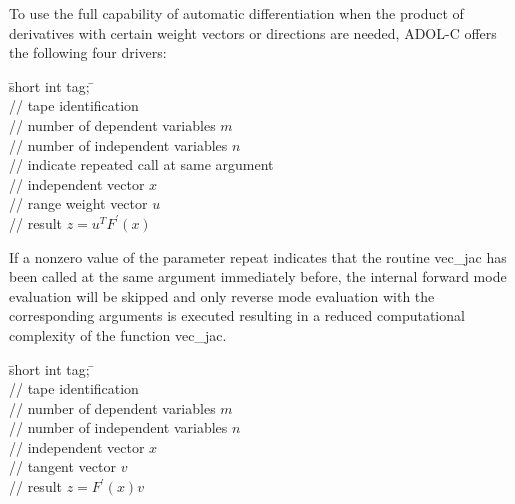 \documentclass[11pt,twoside]{article}
\begin{document}
To use the full capability of automatic differentiation when the 
product of derivatives with certain weight vectors or directions are needed, ADOL-C offers
the following four drivers:  
%
\begin{tabbing}
\hspace{0.5in}\={\sf short int tag;} \hspace{1.1in}\= \kill    %
\\
         \> // tape identification \\
                 \> // number of dependent variables $m$\\ 
                 \> // number of independent variables $n$\\
            \> // indicate repeated call at same argument\\
           \> // independent vector $x$ \\
           \> // range weight vector $u$ \\ 
           \> // result $z = u^TF^\prime (x)$
\end{tabbing}
If a nonzero value of the parameter {\sf repeat} indicates that the
routine {\sf vec\_jac} has been called at the same argument immediately
before, the internal forward mode evaluation will be skipped and only
reverse mode evaluation with the corresponding arguments is executed
resulting in a reduced computational complexity of the function {\sf vec\_jac}.
%
\begin{tabbing}
\hspace{0.5in}\={\sf short int tag;} \hspace{1.1in}\= \kill    %
\\
         \> // tape identification \\
                 \> // number of dependent variables $m$\\
                 \> // number of independent variables $n$\\
           \> // independent vector $x$\\
           \> // tangent vector $v$\\ 
           \> // result $z = F^\prime (x)v$
\end{tabbing}
%
\end{document}
